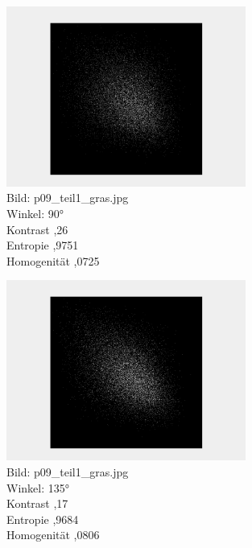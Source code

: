 \documentclass[12pt]{article}
\begin{document}
\begin{figure}[H]
  \centering
  \includegraphics[width=0.7\textwidth, keepaspectratio]{texture_a3.png}\\
  Bild: p09\_teil1\_gras.jpg\\
  Winkel: 90°\\
  Kontrast ,26\\
  Entropie ,9751\\
  Homogenität ,0725
\end{figure}
\begin{figure}[H]
  \centering
  \includegraphics[width=0.7\textwidth, keepaspectratio]{texture_a4.png}\\
  Bild: p09\_teil1\_gras.jpg\\
  Winkel: 135°\\
  Kontrast ,17\\
  Entropie ,9684\\
  Homogenität ,0806
\end{figure}
\end{document}
